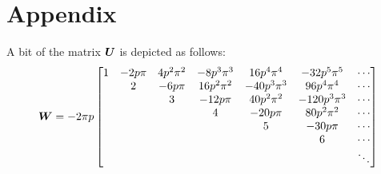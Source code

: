 \section{Appendix}

A bit of the matrix $\boldsymbol{U}$ is depicted as follows:
\begin{align}
  \label{eq:some-of-U}
  \boldsymbol{W} = -2\pi{}p \begin{bmatrix}
    1 & -2 p \pi  & 4 p^2 \pi ^2 & -8 p^3 \pi ^3 & 16 p^4 \pi ^4 & -32 p^5 \pi ^5 & \cdots \\
    & 2 & -6 p \pi  & 16 p^2 \pi ^2 & -40 p^3 \pi ^3 & 96 p^4 \pi ^4 & \cdots \\
    & & 3 & -12 p \pi  & 40 p^2 \pi ^2 & -120 p^3 \pi ^3 & \cdots \\
    & & & 4 & -20 p \pi  & 80 p^2 \pi ^2 & \cdots \\
    & & & & 5 & -30 p \pi & \cdots \\
    & & & & & 6 & \cdots \\
    & & & & & & \ddots
  \end{bmatrix}
\end{align}

